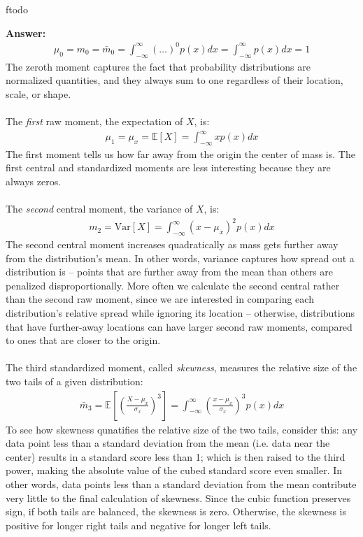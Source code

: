 ƒtodo\documentclass{article}
\newenvironment{QandA}{\begin{enumerate}[label=\arabic*.]}{\end{enumerate}}
\newenvironment{answer}{\par\normalfont \textbf{Answer:}}{}
\newcommand{\Exp}[1]{\mathbb{E}\left[ #1 \right]}
\newcommand{\Vari}[1]{\text{Var}\left[ #1 \right]}
\begin{document}
\begin{QandA}
\begin{answer}
\begin{align*}
            \mu_0 = m_0 = \bar{m}_0 = \int_{-\infty}^{\infty} \left( \ldots \right)^0 p(x)dx = \int_{-\infty}^{\infty} p(x)dx = 1
        \end{align*}
        The zeroth moment captures the fact that probability distributions are normalized quantities, and they always sum to one regardless of their location, scale, or shape. \\\\
        The \textit{first} raw moment, the expectation of $X$, is:
        \begin{align*}
            \mu_1 = \mu_x = \Exp{X} = \int_{-\infty}^{\infty} x p(x)dx
        \end{align*}
        The first moment tells us how far away from the origin the center of mass is. The first central and standardized moments are less interesting because they are always zeros.\\\\
        The \textit{second} central moment, the variance of $X$, is:
        \begin{align*}
            m_2 = \Vari{X} = \int_{-\infty}^{\infty} (x-\mu_x)^2 p(x) dx
        \end{align*}
        The second central moment increases quadratically as mass gets further away from the distribution’s mean. In other words, variance captures how spread out a distribution is -- points that are further away from the mean than others are penalized disproportionally. More often we calculate the second central rather than the second raw moment, since we are interested in comparing each distribution's relative spread while ignoring its location -- otherwise, distributions that have further-away locations can have larger second raw moments, compared to ones that are closer to the origin.\\\\
        The third standardized moment, called \textit{skewness}, measures the relative size of the two tails of a given distribution:
        \begin{align*}
            \bar{m}_3 = \Exp{\left( \frac{X - \mu_x}{\sigma_x} \right)^3} = \int_{-\infty}^{\infty} \left( \frac{x - \mu_x}{\sigma_x}\right)^3 p(x) dx
        \end{align*}
        To see how skewness qunatifies the relative size of the two tails, consider this: any data point less than a standard deviation from the mean (i.e. data near the center) results in a standard score less than 1; which is then raised to the third power, making the absolute value of the cubed standard score even smaller. In other words, data points less than a standard deviation from the mean contribute very little to the final calculation of skewness. Since the cubic function preserves sign, if both tails are balanced, the skewness is zero. Otherwise, the skewness is positive for longer right tails and negative for longer left tails. \\\\

\end{answer}
\end{QandA}
\end{document}
